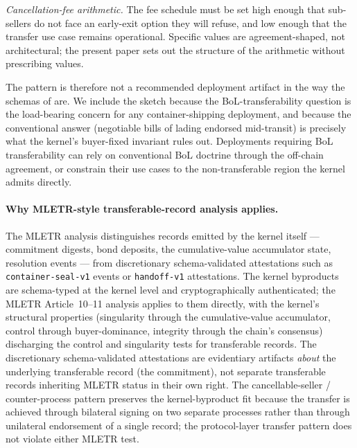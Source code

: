 \documentclass[11pt,a4paper]{article}
\theoremstyle{definition}
\theoremstyle{remark}
\begin{document}
\emph{Cancellation-fee arithmetic.} The fee schedule must be set
high enough that sub-sellers do not face an early-exit option
they will refuse, and low enough that the transfer use case
remains operational. Specific values are agreement-shaped, not
architectural; the present paper sets out the structure of the
arithmetic without prescribing values.

The pattern is therefore not a recommended deployment artifact in
the way the schemas of  are. We include the
sketch because the BoL-transferability question is the
load-bearing concern for any container-shipping deployment, and
because the conventional answer (negotiable bills of lading
endorsed mid-transit) is precisely what the kernel's buyer-fixed
invariant rules out. Deployments requiring BoL transferability
can rely on conventional BoL doctrine through the off-chain
agreement, or constrain their use cases to the non-transferable
region the kernel admits directly.

\paragraph{Why MLETR-style transferable-record analysis applies.}
The MLETR analysis distinguishes records emitted by the kernel
itself --- commitment digests, bond deposits, the cumulative-value
accumulator state, resolution events --- from discretionary
schema-validated attestations such as \texttt{container-seal-v1}
events or \texttt{handoff-v1} attestations. The kernel byproducts
are schema-typed at the kernel level and cryptographically
authenticated; the MLETR Article~10--11 analysis applies to them
directly, with the kernel's structural properties (singularity
through the cumulative-value accumulator, control through
buyer-dominance, integrity through the chain's consensus)
discharging the control and singularity tests for transferable
records. The discretionary schema-validated attestations are
evidentiary artifacts \emph{about} the underlying transferable
record (the commitment), not separate transferable records
inheriting MLETR status in their own right. The cancellable-seller
/ counter-process pattern preserves the kernel-byproduct fit
because the transfer is achieved through bilateral signing on
two separate processes rather than through unilateral endorsement
of a single record; the protocol-layer transfer pattern does not
violate either MLETR test.
\end{document}
